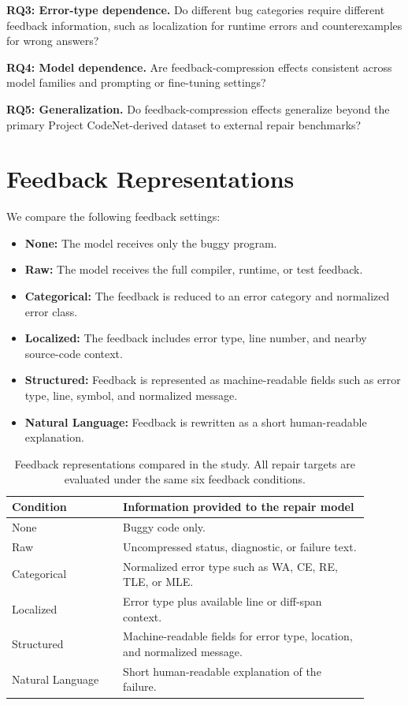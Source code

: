 \documentclass[conference]{IEEEtran}
\begin{document}
\textbf{RQ3: Error-type dependence.} Do different bug categories require different feedback information, such as localization for runtime errors and counterexamples for wrong answers?

\textbf{RQ4: Model dependence.} Are feedback-compression effects consistent across model families and prompting or fine-tuning settings?

\textbf{RQ5: Generalization.} Do feedback-compression effects generalize beyond the primary Project CodeNet-derived dataset to external repair benchmarks?

\section{Feedback Representations}

We compare the following feedback settings:

\begin{itemize}
    \item \textbf{None:} The model receives only the buggy program.
    \item \textbf{Raw:} The model receives the full compiler, runtime, or test feedback.
    \item \textbf{Categorical:} The feedback is reduced to an error category and normalized error class.
    \item \textbf{Localized:} The feedback includes error type, line number, and nearby source-code context.
    \item \textbf{Structured:} Feedback is represented as machine-readable fields such as error type, line, symbol, and normalized message.
    \item \textbf{Natural Language:} Feedback is rewritten as a short human-readable explanation.
\end{itemize}

\begin{table}[t]
\centering
\caption{Feedback representations compared in the study. All repair targets are evaluated under the same six feedback conditions.}
\label{tab:feedback-representations}
\begin{tabular}{@{}p{0.28\linewidth}p{0.62\linewidth}@{}}
\toprule
Condition & Information provided to the repair model \\
\midrule
None & Buggy code only. \\
Raw & Uncompressed status, diagnostic, or failure text. \\
Categorical & Normalized error type such as WA, CE, RE, TLE, or MLE. \\
Localized & Error type plus available line or diff-span context. \\
Structured & Machine-readable fields for error type, location, and normalized message. \\
Natural Language & Short human-readable explanation of the failure. \\
\bottomrule
\end{tabular}
\end{table}
\end{document}
